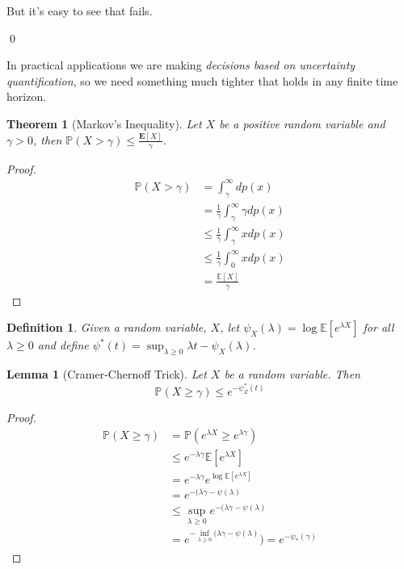 \documentclass[11pt]{article}
\newtheorem{theorem}{Theorem}
\newtheorem{lemma}{Lemma}
\newtheorem{definition}{Definition}
\renewcommand{\P}{\mathbb{P}}
\newcommand{\E}{\mathbb{E}}
\newcommand{\1}{\mathbf{1}}
\begin{document}
But it's easy to see that fails. 

\qed



In practical applications we are making \textit{decisions based on uncertainty quantification}, so we need something much tighter that holds in any finite time horizon.

\begin{theorem}[Markov's Inequality]
    Let $X$ be a positive random variable and $\gamma > 0$, then $\P(X > \gamma) \leq \frac{\mathbf{E}[X]}{\gamma}$.
\end{theorem}
\begin{proof}
    \begin{align*}
        \P(X > \gamma)
        &= \int_{\gamma}^{\infty} dp(x)\\
        &= \frac{1}{\gamma}\int_{\gamma}^{\infty} \gamma dp(x)\\
        &\leq \frac{1}{\gamma}\int_{\gamma}^{\infty} x dp(x)\\
        &\leq \frac{1}{\gamma}\int_{0}^{\infty} x dp(x)\\
        &= \frac{\E[X]}{\gamma}
    \end{align*}
\end{proof}

\begin{definition}
    Given a random variable, $X$, let $\psi_X(\lambda) = \log\E[e^{\lambda X}]$ for all $\lambda \geq 0$ and define $\psi^{\ast}(t) = \sup_{\lambda \geq 0} \lambda t - \psi_X(\lambda)$.
\end{definition}

\begin{lemma}[Cramer-Chernoff Trick]
Let $X$ be a random variable. Then 
\[\P(X \geq \gamma) \leq e^{-\psi^{\ast}_Z(t)}\]
\end{lemma}
\begin{proof}
    \begin{align*}
        \P(X \geq \gamma) 
        &= \P(e^{\lambda X} \geq e^{\lambda\gamma})\\
        &\leq e^{-\lambda \gamma}\E[e^{\lambda X}]\tag{Markov's Inequality}\\
        &= e^{-\lambda \gamma}e^{\log\E[e^{\lambda X}]}\\
        &= e^{-(\lambda \gamma - \psi(\lambda)}\\
        &\leq \sup_{\lambda \geq 0} e^{-(\lambda \gamma - \psi(\lambda)}\\
        &= e^{-\inf_{\lambda \geq 0}(\lambda \gamma - \psi(\lambda)})
        = e^{-\psi_{\ast}(\gamma)}
    \end{align*}
\end{proof}
\end{document}
